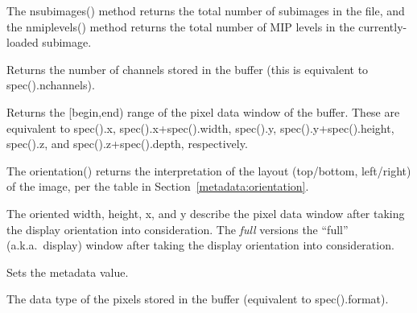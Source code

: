 The {\cf nsubimages()} method returns the total number of subimages in
the file, and the {\cf nmiplevels()} method returns the total number
of MIP levels in the currently-loaded subimage.
\apiend

Returns the number of channels stored in the buffer (this is equivalent
to {\cf spec().nchannels}).
\apiend

Returns the {\cf [begin,end)} range of the pixel data window of the
buffer.  These are equivalent to {\cf spec().x}, {\cf spec().x+spec().width},
{\cf spec().y}, {\cf spec().y+spec().height},
{\cf spec().z}, and {\cf spec().z+spec().depth}, respectively.
\apiend


The {\cf orientation()} returns the interpretation of the layout
(top/bottom, left/right) of the image, per the table in
Section~\ref{metadata:orientation}.

The oriented width, height, x, and y describe the pixel data window
after taking the display orientation into consideration.  The
\emph{full} versions the ``full'' (a.k.a.\ display) window after taking
the display orientation into consideration.
\apiend

Sets the  metadata value.
\apiend

The data type of the pixels stored in the buffer (equivalent to
{\cf spec().format}).
\apiend


